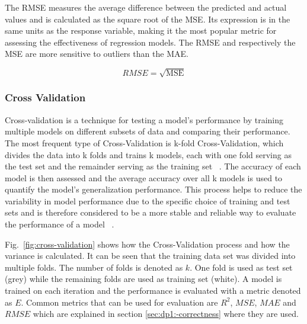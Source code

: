 The RMSE measures the average difference between the predicted and actual values and is calculated as the square root
of the MSE.
Its expression is in the same units as the response variable, making it the most popular metric for assessing the
effectiveness of regression models.
The RMSE and respectively the MSE are more sensitive to outliers than the MAE.

\begin{tcolorbox}[arc=0pt,boxrule=0.5pt]
    \begin{equation}
        \label{eq:rmse}
        RMSE = \sqrt{\text{MSE}}
    \end{equation}
\end{tcolorbox}


\subsubsection{Cross Validation}\label{subsubsec:cross-validation}
Cross-validation is a technique for testing a model's performance by training multiple models on different subsets of
data and comparing their performance.
The most frequent type of Cross-Validation is k-fold Cross-Validation, which divides the data into k folds and trains
k models, each with one fold serving as the test set and the remainder serving as the training set
~\cite[p. 252--260]{muller2016introduction}.
The accuracy of each model is then assessed and the average accuracy over all k models is used to quantify the model's
generalization performance.
This process helps to reduce the variability in model performance due to the specific choice of training and test
sets and is therefore considered to be a more stable and reliable way to evaluate the performance of a
model
~\cite[p. 252--260]{muller2016introduction}.

Fig.~\ref{fig:cross-validation} shows how the Cross-Validation process and how the variance
is calculated.
It can be seen that the training data set was divided into multiple folds.
The number of folds is denoted as $k$.
One fold is used as test set (grey) while the remaining folds are used as training set (white).
A model is trained on each iteration and the performance is evaluated with a metric denoted as $E$.
Common metrics that can be used for evaluation are $R^2$, $MSE$, $MAE$ and $RMSE$ which are explained in section
\ref{sec:dp1:-correctness} where they are used.

